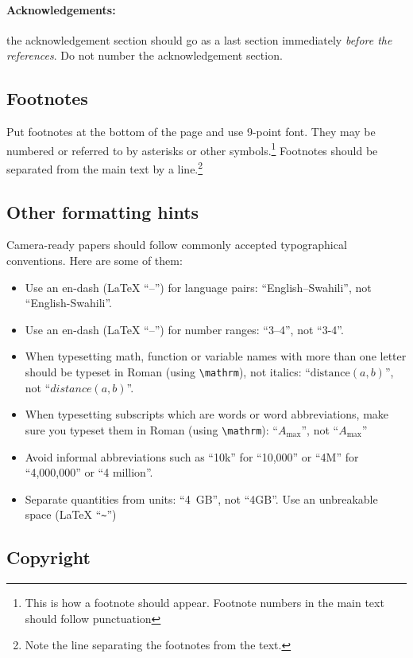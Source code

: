 \documentclass[11pt]{article}
\begin{document}
\paragraph{Acknowledgements:} the acknowledgement section should go as a last section immediately
\textit{before the references}.  Do not number the acknowledgement section.

\subsection{Footnotes}

Put footnotes at the bottom of the page and use
9-point font. They may be numbered or referred to by asterisks or
other symbols.\footnote{This is how a footnote should appear. Footnote numbers in the main text should follow punctuation}
Footnotes should be separated from the main text by a
line.\footnote{Note the line separating the footnotes from the text.}

\subsection{Other formatting hints}
Camera-ready papers should follow commonly accepted typographical conventions. Here are some of them:
\begin{itemize}
\item Use an en-dash (\LaTeX{} ``--'') for language pairs: ``English--Swahili'', not ``English-Swahili''.
\item Use an en-dash (\LaTeX{} ``--'') for number ranges: ``3--4'', not ``3-4''.
\item When typesetting math, function or variable names with more than one letter should be typeset in Roman (using \verb|\mathrm|), not italics: ``\(\mathrm{distance}(a,b)\)'', not ``\(distance(a,b)\)''.
\item When typesetting subscripts which are words or word abbreviations, make sure you typeset them in Roman (using \verb|\mathrm|): ``\(A_\mathrm{max}\)'', not ``\(A_\mathrm{max}\)''
\item Avoid informal abbreviations such as ``10k'' for ``10,000'' or ``4M'' for ``4,000,000'' or ``4 million''.
\item Separate quantities from units: ``4~GB'', not ``4GB''. Use an unbreakable space (\LaTeX{} ``\verb|~|'')
\end{itemize}

\subsection{Copyright}
\end{document}
